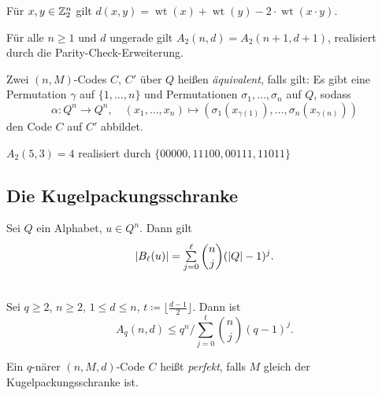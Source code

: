 \documentclass{cheat-sheet}
\newcommand{\floor}[1]{\lfloor #1 \rfloor} %
\DeclareMathOperator{\wt}{wt} %
\begin{document}

\begin{lem}
  Für $x, y \in \mathbb{Z}_2^n$ gilt $d(x,y) = \wt(x) + \wt(y) - 2 \cdot \wt(x \cdot y)$.
\end{lem}

\begin{satz}
  Für alle $n \geq 1$ und $d$ ungerade gilt $A_2(n, d) = A_2(n+1,d+1)$, realisiert durch die Parity-Check-Erweiterung.
\end{satz}

\begin{defn}
  Zwei $(n,M)$-Codes $C$, $C'$ über $Q$ heißen \emph{äquivalent}, falls gilt:
  Es gibt eine Permutation $\gamma$ auf $\{ 1, \ldots, n \}$ und Permutationen $\sigma_1, \ldots, \sigma_n$ auf $Q$, sodass
  \[
    \alpha : Q^n \to Q^n, \quad
    (x_1, \ldots, x_n) \mapsto (\sigma_1(x_{\gamma(1)}), \ldots, \sigma_n(x_{\gamma(n)}))
  \]
  den Code $C$ auf $C'$ abbildet.
\end{defn}




\begin{bsp}
  $A_2(5, 3) = 4$ realisiert durch $\{ 00000, 11100, 00111, 11011 \}$
\end{bsp}

\subsection{Die Kugelpackungsschranke}


\begin{lem}
  Sei $Q$ ein Alphabet, $u \in Q^n$. %
  Dann gilt
  \[ \abs{B_\ell(u)} = \sum_{j=0}^\ell \binom{n}{j} (\abs{Q}-1)^j. \]
\end{lem}

\begin{satz} \mbox{} \\
  Sei $q \geq 2$, $n \geq 2$, $1 \leq d \leq n$, $t \coloneqq \floor{\tfrac{d-1}{2}}$. Dann ist
  \[ A_q(n, d) \leq q^n / \sum_{j=0}^t \binom{n}{j} (q-1)^j. \]
\end{satz}

\begin{defn}
  Ein $q$-närer $(n, M, d)$-Code $C$ heißt \emph{perfekt}, falls $M$ gleich der Kugelpackungsschranke ist.
\end{defn}
\end{document}
